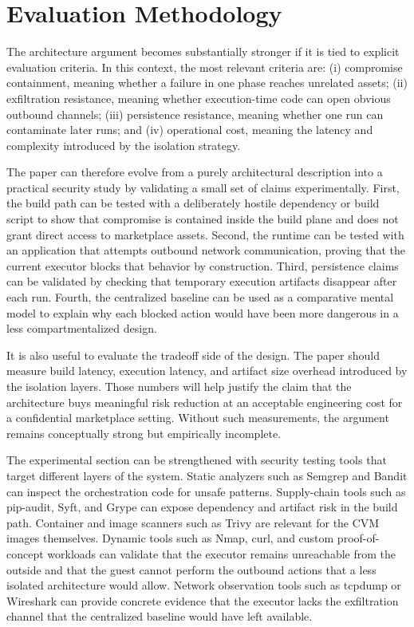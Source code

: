 \documentclass[sigconf,nonacm]{acmart}
\begin{document}
\FloatBarrier
{}
\section{Evaluation Methodology}

The architecture argument becomes substantially stronger if it is tied to explicit evaluation criteria. In this context, the most relevant criteria are: (i) compromise containment, meaning whether a failure in one phase reaches unrelated assets; (ii) exfiltration resistance, meaning whether execution-time code can open obvious outbound channels; (iii) persistence resistance, meaning whether one run can contaminate later runs; and (iv) operational cost, meaning the latency and complexity introduced by the isolation strategy.

The paper can therefore evolve from a purely architectural description into a practical security study by validating a small set of claims experimentally. First, the build path can be tested with a deliberately hostile dependency or build script to show that compromise is contained inside the build plane and does not grant direct access to marketplace assets. Second, the runtime can be tested with an application that attempts outbound network communication, proving that the current executor blocks that behavior by construction. Third, persistence claims can be validated by checking that temporary execution artifacts disappear after each run. Fourth, the centralized baseline can be used as a comparative mental model to explain why each blocked action would have been more dangerous in a less compartmentalized design.

It is also useful to evaluate the tradeoff side of the design. The paper should measure build latency, execution latency, and artifact size overhead introduced by the isolation layers. Those numbers will help justify the claim that the architecture buys meaningful risk reduction at an acceptable engineering cost for a confidential marketplace setting. Without such measurements, the argument remains conceptually strong but empirically incomplete.

The experimental section can be strengthened with security testing tools that target different layers of the system. Static analyzers such as Semgrep and Bandit can inspect the orchestration code for unsafe patterns. Supply-chain tools such as pip-audit, Syft, and Grype can expose dependency and artifact risk in the build path. Container and image scanners such as Trivy are relevant for the CVM images themselves. Dynamic tools such as Nmap, curl, and custom proof-of-concept workloads can validate that the executor remains unreachable from the outside and that the guest cannot perform the outbound actions that a less isolated architecture would allow. Network observation tools such as tcpdump or Wireshark can provide concrete evidence that the executor lacks the exfiltration channel that the centralized baseline would have left available.
\end{document}

